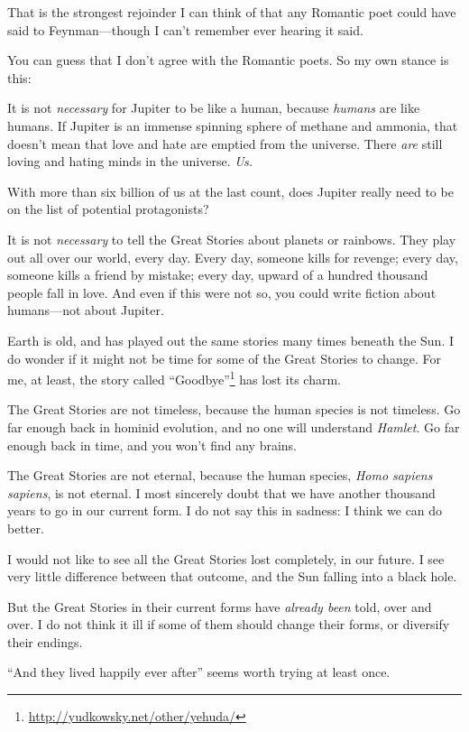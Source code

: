 {
 That is the strongest rejoinder I can think of that any Romantic
poet could have said to Feynman---though I can't
remember ever hearing it said.}

{
 You can guess that I don't agree with the Romantic
poets. So my own stance is this:}

{
 It is not \textit{necessary} for Jupiter to be like a human,
because \textit{humans} are like humans. If Jupiter is an immense
spinning sphere of methane and ammonia, that doesn't
mean that love and hate are emptied from the universe. There
\textit{are} still loving and hating minds in the universe.
\textit{Us.}}

{
 With more than six billion of us at the last count, does Jupiter
really need to be on the list of potential protagonists?}

{
 It is not \textit{necessary} to tell the Great Stories about
planets or rainbows. They play out all over our world, every day. Every
day, someone kills for revenge; every day, someone kills a friend by
mistake; every day, upward of a hundred thousand people fall in love.
And even if this were not so, you could write fiction about
humans---not about Jupiter.}

{
 Earth is old, and has played out the same stories many times
beneath the Sun. I do wonder if it might not be time for some of the
Great Stories to change. For me, at least, the story called
``Goodbye''\footnote{\url{http://yudkowsky.net/other/yehuda/}} has lost its charm.}

{
 The Great Stories are not timeless, because the human species is
not timeless. Go far enough back in hominid evolution, and no one will
understand \textit{Hamlet}. Go far enough back in time, and you
won't find any brains.}

{
 The Great Stories are not eternal, because the human species,
\textit{Homo sapiens sapiens}, is not eternal. I most sincerely doubt
that we have another thousand years to go in our current form. I do not
say this in sadness: I think we can do better.}

{
 I would not like to see all the Great Stories lost completely, in
our future. I see very little difference between that outcome, and the
Sun falling into a black hole.}

{
 But the Great Stories in their current forms have \textit{already
been} told, over and over. I do not think it ill if some of them should
change their forms, or diversify their endings.}

{
 ``And they lived happily ever
after'' seems worth trying at least once.}

